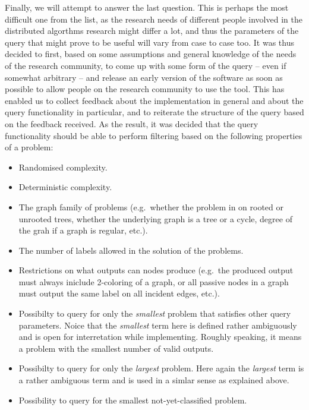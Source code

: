 Finally, we will attempt to answer the last question.
This is perhaps the most difficult one from the list,
as the research needs of different people involved in
the distributed algorthms research might differ a lot, and thus
the parameters of the query that might prove to be useful
will vary from case to case too. It was thus decided to first,
based on some assumptions and general knowledge of the
needs of the research community, to come up with some form of the
query -- even if somewhat arbitrary -- and release an early version
of the software as soon as possible to allow people on the
research community to use the tool. This has enabled us to
collect feedback about the implementation in general and about the
query functionality in particular, and to reiterate the structure of
the query based on the feedback received. As the result, it was
decided that the query functionality should be able to perform
filtering based on the following properties of a problem:

\begin{itemize}
  \item Randomised complexity.
  \item Deterministic complexity.
  \item The graph family of problems (e.g.\ whether the problem in on
  rooted or unrooted trees, whether the underlying graph is a tree
  or a cycle, degree of the grah if a graph is regular, etc.).
  \item The number of labels allowed in the solution of the problems.
  \item Restrictions on what outputs can nodes produce (e.g.\ the
  produced output must always iniclude 2-coloring of a graph,
  or all passive nodes in a graph must output the same
  label on all incident edges, etc.).
  \item Possibilty to query for only the \emph{smallest} problem that
  satisfies other query parameters. Noice that the \emph{smallest} term here is
  defined rather ambiguously and is open for interretation while implementing. Roughly speaking, it means a problem with the smallest
  number of valid outputs.
  \item Possibilty to query for only the \emph{largest} problem. Here again
  the \emph{largest} term is a rather ambiguous term and is used in a simlar sense
  as explained above.
  \item Possibility to query for the smallest not-yet-classified problem.
\end{itemize}

